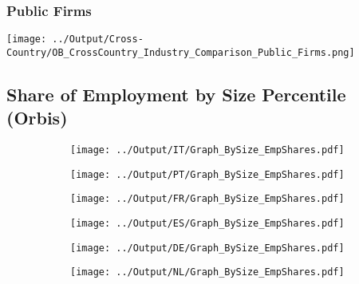 \documentclass[12pt,notitlepage]{article}
\begin{document}
\subsubsection{Public Firms}
\begin{center}
 \texttt{[image: ../Output/Cross-Country/OB\_CrossCountry\_Industry\_Comparison\_Public\_Firms.png]}
\end{center}

\clearpage



























\subsection{Share of Employment by Size Percentile (Orbis)}
\begin{figure}[!htpb]
\centering
\begin{subfigure}{.49\textwidth}
    \centering
 \texttt{[image: ../Output/IT/Graph\_BySize\_EmpShares.pdf]}
\end{subfigure}%
\begin{subfigure}{.49\textwidth}
    \centering
 \texttt{[image: ../Output/PT/Graph\_BySize\_EmpShares.pdf]}
\end{subfigure}
\begin{subfigure}{.49\textwidth}
    \centering
 \texttt{[image: ../Output/FR/Graph\_BySize\_EmpShares.pdf]}
\end{subfigure}%
\begin{subfigure}{.49\textwidth}
    \centering
 \texttt{[image: ../Output/ES/Graph\_BySize\_EmpShares.pdf]}
\end{subfigure}
\begin{subfigure}{.49\textwidth}
    \centering
 \texttt{[image: ../Output/DE/Graph\_BySize\_EmpShares.pdf]}
\end{subfigure}
\begin{subfigure}{.49\textwidth}
    \centering
 \texttt{[image: ../Output/NL/Graph\_BySize\_EmpShares.pdf]}
\end{subfigure}
\end{figure}
\end{document}

